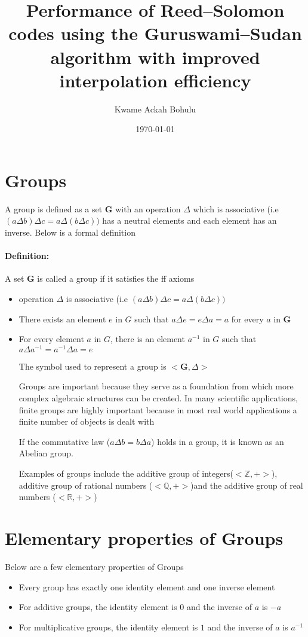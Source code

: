 \documentclass[fontsize=12pt]{article}
\title{Performance of Reed–Solomon codes using the
Guruswami–Sudan algorithm with improved
interpolation efficiency}
\author{Kwame Ackah Bohulu}
\date{\today}
\begin{document}
\maketitle

\newpage
\section{Groups}
 A group is defined as a set $\mathbf{G}$ with an operation $\Delta$ which 
is associative (i.e $(a\Delta b) \Delta c = a\Delta (b \Delta c ))$ has a neutral elements and 
each element has an inverse. Below is a formal definition
 \paragraph{Definition: } A set $\mathbf{G}$ is called a group if it satisfies the ff axioms
 
 \begin{itemize}
 \item operation $\Delta$ is associative  (i.e $(a\Delta b) \Delta c = 
 a\Delta (b \Delta c ))$
 \item There exists an element $e$ in $G$ such that $a \Delta e = e \Delta a =a$ for 
 every $a$ in $\mathbf{G}$
 \item For every element $a$ in $G$, there is an element $a^{-1}$ in $G$ such that 
 $a \Delta a^{-1} = a^{-1} \Delta a  = e$
 

 The symbol used to represent a group is $< \mathbf{G}, \Delta >$ 
 
 Groups are important because they serve as a foundation from which more complex
 algebraic structures can be created. In many scientific applications, finite groups are 
 highly important because in most real world applications a finite number of objects is
 dealt with
 
 If the commutative law ($a \Delta b = b \Delta a$) holds in a group, it is known as 
 an Abelian group.
 
 Examples of groups include the additive group of integers($<\mathbb{Z}, +>$), 
 additive group of rational
 numbers ($<\mathbb{Q}, +>$)and the additive group of real numbers
 ($<\mathbb{R}, +>$)
 \end{itemize}


\section{Elementary properties of Groups}
Below are a few elementary properties of Groups
\begin{itemize}
\item Every group has exactly one identity element and one inverse element
\item For additive groups, the identity element is $0$ and the inverse of $a$ is
$-a$
\item For multiplicative groups, the identity element is $1$ and the inverse of $a$ is 
$a^{-1}$
\end{itemize}
 
\end{document}
